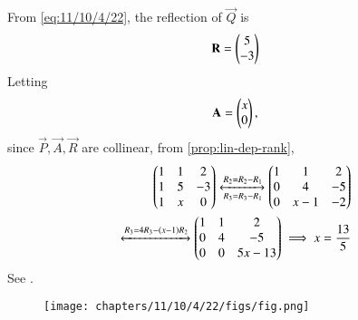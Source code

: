 	From \eqref{eq:11/10/4/22},
the reflection of $\vec{Q}$ is 
\begin{align}
\mathbf{R}  
= \begin{pmatrix}5\\-3\end{pmatrix}
\end{align}
Letting
\begin{align}
\mathbf{A} = \begin{pmatrix}x\\0\end{pmatrix},
\end{align}
since 
$\vec{P},
\vec{A},  
\vec{R}  
$
are collinear, 
		from \eqref{prop:lin-dep-rank},
\begin{align}
	\begin{pmatrix}
		1 & 1 & 2 
		\\ 
		1 & 5 & -3 
		\\
		1 & x & 0 \end{pmatrix}
	\xleftrightarrow[R_3=R_3 - R_1]{R_2 = R_2 - R_1}
	\begin{pmatrix}
		1 & 1 & 2 
		\\ 
		0 & 4 & -5 
		\\
		0 & x-1 & -2 \end{pmatrix}
	\\
	\xleftrightarrow[]{R_3 = 4R_3 - \ensuremath{\left(x-1\right)}R_2}
	\begin{pmatrix}
		1 & 1 & 2 
		\\ 
		0 & 4 & -5 
		\\
		0 & 0 & 5x-13 \end{pmatrix}
	\implies x = \frac{13}{5}
\end{align}
See  
.
\begin{figure}[H]
\centering
\texttt{[image: chapters/11/10/4/22/figs/fig.png]}
\caption{}
\label{fig:chapters/11/10/4/22/1}
\end{figure}



